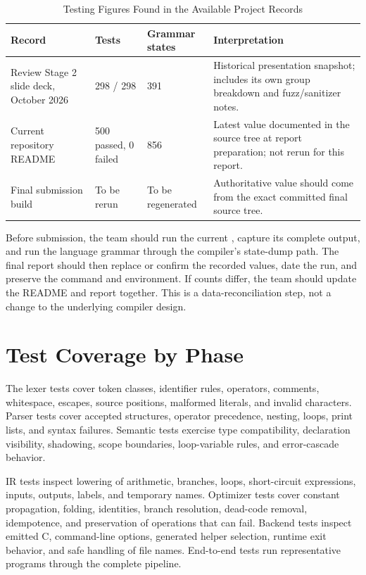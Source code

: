 \documentclass[12pt,a4paper,oneside]{report}
\newcommand{\code}[1]{\texttt{\detokenize{#1}}}
\begin{document}
\begin{table}[H]
\centering
\caption{Testing Figures Found in the Available Project Records}
\begin{tabularx}{\textwidth}{p{3.2cm}p{2.6cm}p{2.4cm}Y}
\toprule
\textbf{Record} & \textbf{Tests} & \textbf{Grammar states} & \textbf{Interpretation}\\
\midrule
Review Stage 2 slide deck, October 2026 & 298 / 298 & 391 & Historical presentation snapshot; includes its own group breakdown and fuzz/sanitizer notes.\\
Current repository README & 500 passed, 0 failed & 856 & Latest value documented in the source tree at report preparation; not rerun for this report.\\
Final submission build & To be rerun & To be regenerated & Authoritative value should come from the exact committed final source tree.\\
\bottomrule
\end{tabularx}
\end{table}

Before submission, the team should run the current \code{make test}, capture its complete output, and run the language grammar through the compiler's state-dump path. The final report should then replace or confirm the recorded values, date the run, and preserve the command and environment. If counts differ, the team should update the README and report together. This is a data-reconciliation step, not a change to the underlying compiler design.

\section{Test Coverage by Phase}
The lexer tests cover token classes, identifier rules, operators, comments, whitespace, escapes, source positions, malformed literals, and invalid characters. Parser tests cover accepted structures, operator precedence, nesting, loops, print lists, and syntax failures. Semantic tests exercise type compatibility, declaration visibility, shadowing, scope boundaries, loop-variable rules, and error-cascade behavior.

IR tests inspect lowering of arithmetic, branches, loops, short-circuit expressions, inputs, outputs, labels, and temporary names. Optimizer tests cover constant propagation, folding, identities, branch resolution, dead-code removal, idempotence, and preservation of operations that can fail. Backend tests inspect emitted C, command-line options, generated helper selection, runtime exit behavior, and safe handling of file names. End-to-end tests run representative programs through the complete pipeline.
\end{document}
